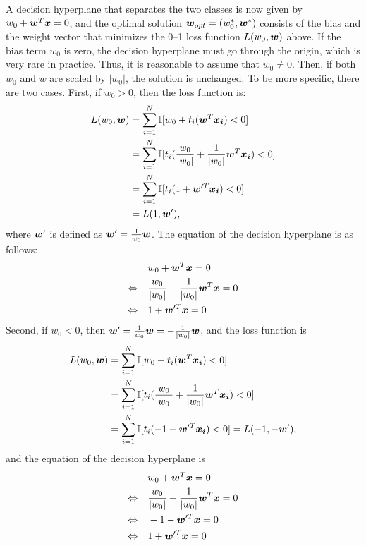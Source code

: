 A decision hyperplane that separates the two classes is now given by
$w_0 + \boldsymbol{w}^T\boldsymbol{x} = 0$, and the optimal solution $\boldsymbol{w}_{opt} =
(w_0^*, \boldsymbol{w}^*)$ consists of the bias and the weight vector that
minimizes the 0--1 loss function $L(w_0, \boldsymbol{w})$ above. If the bias term
$w_0$ is zero, the decision hyperplane must go through the origin,
which is very rare in practice. Thus, it is reasonable to assume that
$w_0 \not= 0$. Then, if both $w_0$ and $w$ are scaled by $|w_0|$, the
solution is unchanged. To be more specific, there are two
cases. First, if $w_0>0$, then the loss function is:
\[ \begin{split}
L(w_0,\boldsymbol{w}) &= \sum_{i=1}^N \mathbb{I} [w_0 + t_i (\boldsymbol{w}^T \boldsymbol{x_i}) < 0] \\
&=\sum_{i=1}^N \mathbb{I} [t_i (\frac{w_0}{|w_0|} + \frac{1}{|w_0|}\boldsymbol{w}^T \boldsymbol{x_i}) < 0]  \\
&= \sum_{i=1}^N \mathbb{I} [t_i (1 + \boldsymbol{w}'^T \boldsymbol{x_i}) < 0] \\
&= L(1, \boldsymbol{w}'),\\
\end{split} \]
where $\boldsymbol{w}'$ is defined as $\boldsymbol{w}' = \frac{1}{w_0}\boldsymbol{w}$. The equation of the
decision hyperplane is as follows:
\[ \begin{split} 
&w_0 + \boldsymbol{w}^T\boldsymbol{x} = 0 \\
\Leftrightarrow \quad
&\frac{w_0}{|w_0|} + \frac{1}{|w_0|} \boldsymbol{w}^T \boldsymbol{x}  = 0 \\ \Leftrightarrow \quad
&1 + \boldsymbol{w}'^T \boldsymbol{x} = 0
\end{split} \]
Second, if $w_0 < 0$, then $\boldsymbol{w}' = \frac{1}{w_0}\boldsymbol{w} = -\frac{1}{|w_0|}\boldsymbol{w}$, and the loss function is 
\[ \begin{split}
L(w_0,\boldsymbol{w}) &= \sum_{i=1}^N \mathbb{I} [w_0 + t_i (\boldsymbol{w}^T \boldsymbol{x_i}) < 0] \\
&=\sum_{i=1}^N \mathbb{I} [t_i (\frac{w_0}{|w_0|} + \frac{1}{|w_0|}\boldsymbol{w}^T \boldsymbol{x_i}) < 0]  \\
&= \sum_{i=1}^N \mathbb{I} [t_i (-1 - \boldsymbol{w}'^T \boldsymbol{x_i}) < 0] 
= L(-1, -\boldsymbol{w}'),\\
\end{split} \]
and the equation of the decision hyperplane is 
\[ \begin{split} 
&w_0 + \boldsymbol{w}^T\boldsymbol{x} = 0 \\
\Leftrightarrow \quad
&\frac{w_0}{|w_0|} + \frac{1}{|w_0|} \boldsymbol{w}^T \boldsymbol{x}  = 0 \\ \Leftrightarrow \quad
&-1 - \boldsymbol{w}'^T \boldsymbol{x} = 0 \\
\Leftrightarrow \quad
&1 + \boldsymbol{w}'^T \boldsymbol{x} = 0
\end{split} \]
